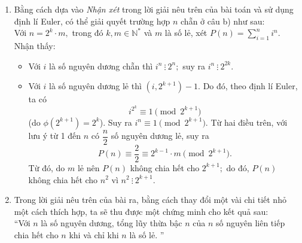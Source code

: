 \begin{bt}
{\begin{nx}
\begin{enumerate}[1.]
Có thể thấy, cách giải trên có được nhờ khai thác các tính chất đặc thù của giá trị $n=5.$ do đó, không thể áp dụng cách giải này vào việc xử lý câu b) (kể cả khi xét trường hợp $n$ lẻ).
\item Bằng cách dựa vào \textit{Nhận xét} trong lời giải nêu trên của bài toán và sử dụng định lí Euler, có thể giải quyết trường hợp $n$ chẵn ở câu b) như sau:\\
Với $n=2^k\cdot m,$ trong đó $k, m \in\mathbb{N^*}$ và $m$ là số lẻ, xét $P(n)=\sum\limits_{i=1}^n i^n.$ Nhận thấy:
\begin{itemize}
\item Với $i$ là số nguyên dương chẵn thì $i^n \ \vdots \ 2^n;$ suy ra $i^n \ \vdots \ 2^{2k}.$
\item  Với $i$ là số nguyên dương lẻ thì $(i,2^{k+1})-1.$ Do đó, theo định lí Euler, ta có
$$ i^{2^k}\equiv 1\pmod{2^{k+1}} $$ (do $\phi(2^{k+1})=2^k$). Suy ra $i^n\equiv 1 \pmod {2^{k+1}}.$ Từ hai điều trên, với lưu ý từ 1 đến $n$ có $\dfrac{n}{2}$ số nguyên dương lẻ, suy ra
	$$ P(n)\equiv \frac{2}{2}\equiv 2^{k-1}\cdot m\pmod{2^{k+1}}. $$ Từ đó, do $m$ lẻ nên $P(n)$ không chia hết cho $2^{k+1};$ do đó, $P(n)$ không chia hết cho $n^2$ vì $n^2 \ \vdots \ 2^{k+1}.$
\end{itemize}
\item Trong lời giải nêu trên của bài ra, bằng cách thay đổi một vài chi tiết nhỏ một cách thích hợp, ta sẽ thu được một chứng minh cho kết quả sau:\\
``Với $n$ là số nguyên dương, tổng lũy thừa bậc $n$ của $n$ số nguyên liên tiếp chia hết cho $n$  khi và chỉ khi $n$ là số lẻ. ''
\end{enumerate}
\end{nx}
}
\end{bt}


